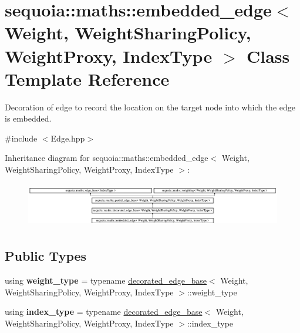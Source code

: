 \hypertarget{classsequoia_1_1maths_1_1embedded__edge}{}\section{sequoia\+::maths\+::embedded\+\_\+edge$<$ Weight, Weight\+Sharing\+Policy, Weight\+Proxy, Index\+Type $>$ Class Template Reference}
\label{classsequoia_1_1maths_1_1embedded__edge}


Decoration of edge to record the location on the target node into which the edge is embedded.  




{\ttfamily \#include $<$Edge.\+hpp$>$}

Inheritance diagram for sequoia\+::maths\+::embedded\+\_\+edge$<$ Weight, Weight\+Sharing\+Policy, Weight\+Proxy, Index\+Type $>$\+:\begin{figure}[H]
\begin{center}
\leavevmode
\includegraphics[height=1.971831cm]{classsequoia_1_1maths_1_1embedded__edge}
\end{center}
\end{figure}
\subsection*{Public Types}
\begin{DoxyCompactItemize}
\item 
\mbox{\label{classsequoia_1_1maths_1_1embedded__edge_a79e835653e8a2651124e6302c72b69c7}} 
using {\bfseries weight\+\_\+type} = typename \mbox{\hyperlink{classsequoia_1_1maths_1_1decorated__edge__base}{decorated\+\_\+edge\+\_\+base}}$<$ Weight, Weight\+Sharing\+Policy, Weight\+Proxy, Index\+Type $>$\+::weight\+\_\+type
\item 
\mbox{\label{classsequoia_1_1maths_1_1embedded__edge_ae9ad52cd8171cb3d6b0f3a870ff0d6cd}} 
using {\bfseries index\+\_\+type} = typename \mbox{\hyperlink{classsequoia_1_1maths_1_1decorated__edge__base}{decorated\+\_\+edge\+\_\+base}}$<$ Weight, Weight\+Sharing\+Policy, Weight\+Proxy, Index\+Type $>$\+::index\+\_\+type
\end{DoxyCompactItemize}
